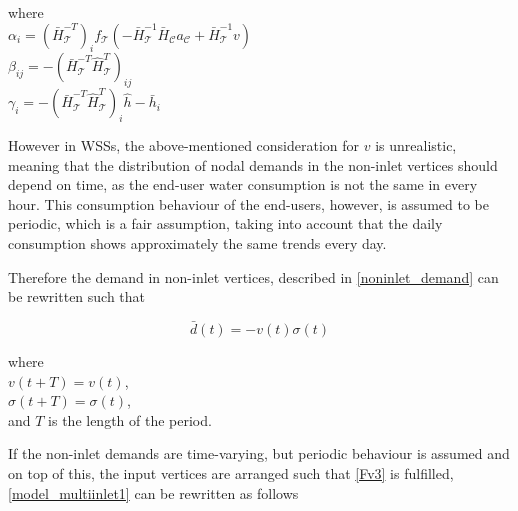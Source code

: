  \begin{minipage}[t]{0.50\textwidth}
where\\
\hspace*{8mm} $ \alpha_i = (\bar{H}^{-T}_{\mathcal{T}})_i f_{\mathcal{T}}(-\bar{H}^{-1}_{\mathcal{T}} \bar{H}_{\mathcal{C}} a_{\mathcal{C}} + \bar{H}^{-1}_{\mathcal{T}} v)$ \\
\vspace*{7pt}
\hspace*{8mm} $ \beta_{ij} = -(\bar{H}^{-T}_{\mathcal{T}}\hat{H}^{T}_{\mathcal{T}})_{ij} $ \\
\vspace*{7pt}
\hspace*{8mm} $ \gamma_{i} = -(\bar{H}^{-T}_{\mathcal{T}}\hat{H}^{T}_{\mathcal{T}})_{i}\hat{h} - \bar{h}_i $ 

\end{minipage}

However in WSSs, the above-mentioned consideration for $v$ is unrealistic, meaning that the distribution of nodal demands in the non-inlet vertices should depend on time, as the end-user water consumption is not the same in every hour. This consumption behaviour of the end-users, however, is assumed to be periodic, which is a fair assumption, taking into account that the daily consumption shows approximately the same trends every day. 

Therefore the demand in non-inlet vertices, described in \eqref{noninlet_demand} can be rewritten such that

\begin{equation}
\label{noninlet_demand_time_varying}
\bar{d}(t) = - v(t) \sigma(t)
\end{equation}

\begin{minipage}[t]{0.45\textwidth}
where\\
\hspace*{8mm} $v(t+T) = v(t)$,\\
\hspace*{8mm} $\sigma(t+T) = \sigma(t)$,\\
\hspace*{8mm} and $T$ is the length of the period.
\end{minipage}

If the non-inlet demands are time-varying, but periodic behaviour is assumed and on top of this, the input vertices are arranged such that \eqref{Fv3} is fulfilled, \eqref{model_multiinlet1} can be rewritten as follows

